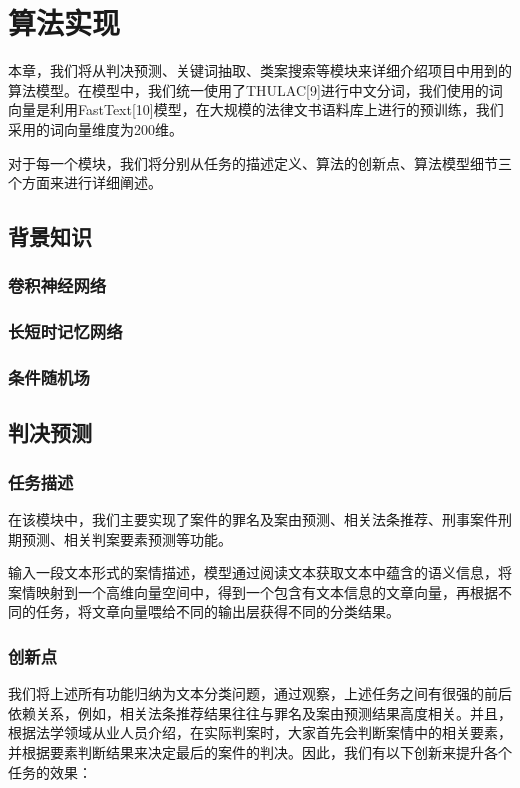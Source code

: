 \chapter{算法实现}
本章，我们将从判决预测、关键词抽取、类案搜索等模块来详细介绍项目中用到的算法模型。在模型中，我们统一使用了THULAC[9]进行中文分词，我们使用的词向量是利用FastText[10]模型，在大规模的法律文书语料库上进行的预训练，我们采用的词向量维度为200维。

对于每一个模块，我们将分别从任务的描述定义、算法的创新点、算法模型细节三个方面来进行详细阐述。

\section{背景知识}
\subsection{卷积神经网络}

\subsection{长短时记忆网络}

\subsection{条件随机场}


\section{判决预测}
\subsection{任务描述}
在该模块中，我们主要实现了案件的罪名及案由预测、相关法条推荐、刑事案件刑期预测、相关判案要素预测等功能。

输入一段文本形式的案情描述，模型通过阅读文本获取文本中蕴含的语义信息，将案情映射到一个高维向量空间中，得到一个包含有文本信息的文章向量，再根据不同的任务，将文章向量喂给不同的输出层获得不同的分类结果。

\subsection{创新点}
我们将上述所有功能归纳为文本分类问题，通过观察，上述任务之间有很强的前后依赖关系，例如，相关法条推荐结果往往与罪名及案由预测结果高度相关。并且，根据法学领域从业人员介绍，在实际判案时，大家首先会判断案情中的相关要素，并根据要素判断结果来决定最后的案件的判决。因此，我们有以下创新来提升各个任务的效果：

